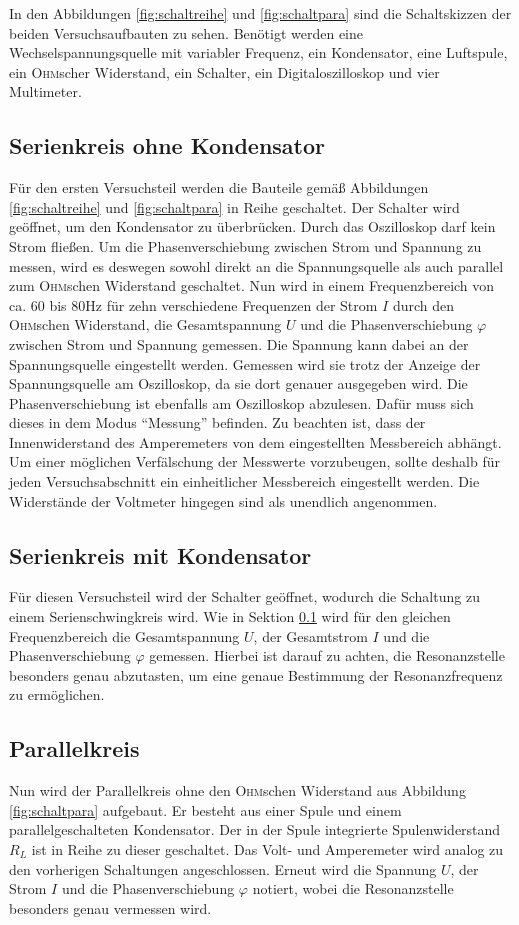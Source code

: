 \documentclass[12pt,a4paper,titlepage,headinclude]{scrartcl}
\numberwithin{equation}{subsection}
\newcommand{\person}[1]{\textsc{#1}}
\begin{document}
In den Abbildungen \ref{fig:schaltreihe} und \ref{fig:schaltpara} sind die Schaltskizzen der beiden Versuchsaufbauten zu sehen. Benötigt werden eine Wechselspannungsquelle mit variabler Frequenz, ein Kondensator, eine Luftspule, ein \person{Ohm}scher Widerstand, ein Schalter, ein Digitaloszilloskop und vier Multimeter. 
\subsection{Serienkreis ohne Kondensator}
\label{sec:serie1}
Für den ersten Versuchsteil werden die Bauteile gemäß Abbildungen \ref{fig:schaltreihe} und \ref{fig:schaltpara} in Reihe geschaltet. Der Schalter wird geöffnet, um den Kondensator zu überbrücken. Durch das Oszilloskop darf kein Strom fließen. Um die Phasenverschiebung zwischen Strom und Spannung zu messen, wird es deswegen sowohl direkt an die Spannungsquelle als auch parallel zum \person{Ohm}schen Widerstand geschaltet. Nun wird in einem Frequenzbereich von ca. 60 bis 80\;Hz für zehn verschiedene Frequenzen der Strom $I$ durch den \person{Ohm}schen Widerstand, die Gesamtspannung $U$ und die Phasenverschiebung  $\varphi$ zwischen Strom und Spannung gemessen. Die Spannung kann dabei an der Spannungsquelle eingestellt werden. Gemessen wird sie trotz der Anzeige der Spannungsquelle am Oszilloskop, da sie dort genauer ausgegeben wird. Die Phasenverschiebung ist ebenfalls am Oszilloskop abzulesen. Dafür muss sich dieses in dem Modus "`Messung"' befinden. Zu beachten ist, dass der Innenwiderstand des Amperemeters von dem eingestellten Messbereich abhängt. Um einer möglichen Verfälschung der Messwerte vorzubeugen, sollte deshalb für jeden Versuchsabschnitt ein einheitlicher Messbereich eingestellt werden. Die Widerstände der Voltmeter hingegen sind als unendlich angenommen.

\subsection{Serienkreis mit Kondensator}
Für diesen Versuchsteil wird der Schalter geöffnet, wodurch die Schaltung zu einem Serienschwingkreis wird. Wie in Sektion \ref{sec:serie1} wird für den gleichen Frequenzbereich die Gesamtspannung $U$, der Gesamtstrom $I$ und die Phasenverschiebung $\varphi$ gemessen. Hierbei ist darauf zu achten, die Resonanzstelle besonders genau abzutasten, um eine genaue Bestimmung der Resonanzfrequenz zu ermöglichen.

\subsection{Parallelkreis}
Nun wird der Parallelkreis ohne den \person{Ohm}schen Widerstand aus Abbildung \ref{fig:schaltpara} aufgebaut. Er besteht aus einer Spule  und einem parallelgeschalteten Kondensator. Der in der Spule integrierte Spulenwiderstand $R_L$ ist in Reihe zu dieser geschaltet. Das Volt- und Amperemeter wird analog zu den vorherigen Schaltungen angeschlossen. Erneut wird die Spannung $U$, der Strom $I$ und die Phasenverschiebung $\varphi$ notiert, wobei die Resonanzstelle besonders genau vermessen wird.
\end{document}
